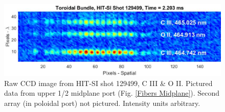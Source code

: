 	\begin{center}
		\begin{figure}
			\centering
			\includegraphics[width=6in]{HITSI_CCD_3.eps}\caption{Raw CCD image from HIT-SI shot 129499, C III \& O II. Pictured data from upper 1/2 midplane port (Fig. \ref{Fibers Midplane}). Second array (in poloidal port) not pictured. Intensity units arbitrary. }\label{HITSI_CCD}
		\end{figure}
	\end{center}
	
	
